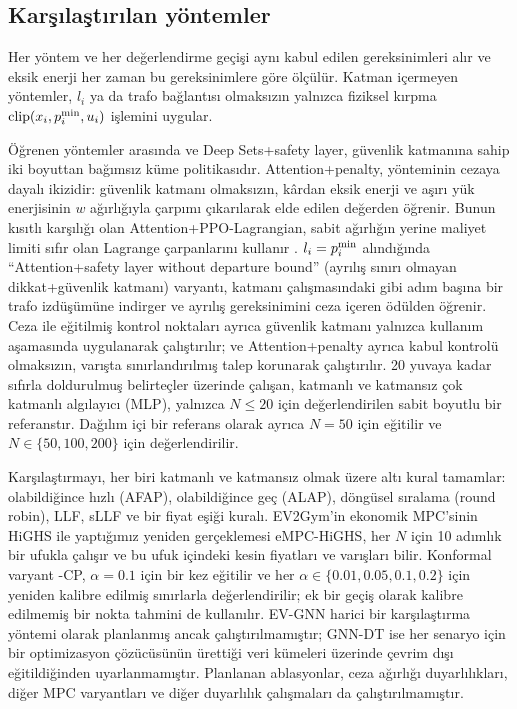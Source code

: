 \subsection{Karşılaştırılan yöntemler}\label{sec:baselines}

Her yöntem ve her değerlendirme geçişi aynı kabul edilen gereksinimleri alır ve eksik enerji her zaman bu gereksinimlere göre ölçülür.
Katman içermeyen yöntemler, $l_i$ ya da trafo bağlantısı olmaksızın yalnızca fiziksel kırpma $\operatorname{clip}(x_i,p^{\min}_i,u_i)$ işlemini uygular.

Öğrenen yöntemler arasında \method{} ve Deep Sets+safety layer, güvenlik katmanına sahip iki boyuttan bağımsız küme politikasıdır.
Attention+penalty, \method{} yönteminin cezaya dayalı ikizidir: güvenlik katmanı olmaksızın, kârdan eksik enerji ve aşırı yük enerjisinin $w$ ağırlığıyla çarpımı çıkarılarak elde edilen değerden öğrenir.
Bunun kısıtlı karşılığı olan Attention+PPO-Lagrangian, sabit ağırlığın yerine maliyet limiti sıfır olan Lagrange çarpanlarını kullanır \cite{altman2021constrained,tessler2018reward}.
$l_i=p^{\min}_i$ alındığında ``Attention+safety layer without departure bound'' (ayrılış sınırı olmayan dikkat+güvenlik katmanı) varyantı, katmanı \cite{wan2025logicinformed} çalışmasındaki gibi adım başına bir trafo izdüşümüne indirger ve ayrılış gereksinimini ceza içeren ödülden öğrenir.
Ceza ile eğitilmiş kontrol noktaları ayrıca güvenlik katmanı yalnızca kullanım aşamasında uygulanarak çalıştırılır; \method{} ve Attention+penalty ayrıca kabul kontrolü olmaksızın, varışta sınırlandırılmış talep korunarak çalıştırılır.
20 yuvaya kadar sıfırla doldurulmuş belirteçler üzerinde çalışan, katmanlı ve katmansız çok katmanlı algılayıcı (MLP), yalnızca $N\le20$ için değerlendirilen sabit boyutlu bir referanstır.
Dağılım içi bir referans olarak \method{} ayrıca $N=50$ için eğitilir ve $N\in\{50,100,200\}$ için değerlendirilir.

Karşılaştırmayı, her biri katmanlı ve katmansız olmak üzere altı kural tamamlar: olabildiğince hızlı (AFAP), olabildiğince geç (ALAP), döngüsel sıralama (round robin), LLF, sLLF \cite{chen2022smoothed} ve bir fiyat eşiği kuralı.
EV2Gym'in ekonomik MPC'sinin \cite{diazlondono2026open} HiGHS ile yaptığımız yeniden gerçeklemesi eMPC-HiGHS, her $N$ için 10 adımlık bir ufukla çalışır ve bu ufuk içindeki kesin fiyatları ve varışları bilir.
Konformal varyant \method{}-CP, $\alpha=0.1$ için bir kez eğitilir ve her $\alpha\in\{0.01,0.05,0.1,0.2\}$ için yeniden kalibre edilmiş sınırlarla değerlendirilir; ek bir geçiş olarak kalibre edilmemiş bir nokta tahmini de kullanılır.
EV-GNN \cite{orfanoudakis2025scalable} harici bir karşılaştırma yöntemi olarak planlanmış ancak çalıştırılmamıştır; GNN-DT \cite{orfanoudakis2026graph} ise her senaryo için bir optimizasyon çözücüsünün ürettiği veri kümeleri üzerinde çevrim dışı eğitildiğinden uyarlanmamıştır.
Planlanan ablasyonlar, ceza ağırlığı duyarlılıkları, diğer MPC varyantları ve diğer duyarlılık çalışmaları da çalıştırılmamıştır.

